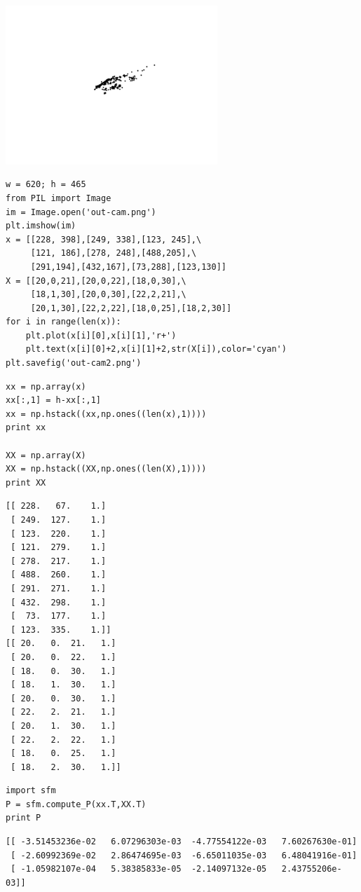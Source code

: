 \documentclass[12pt,fleqn]{article}\usepackage{../common}
\begin{document}
\includegraphics[height=6cm]{mvg_03.png}


\begin{verbatim}
w = 620; h = 465
from PIL import Image
im = Image.open('out-cam.png')
plt.imshow(im)
x = [[228, 398],[249, 338],[123, 245],\
     [121, 186],[278, 248],[488,205],\
     [291,194],[432,167],[73,288],[123,130]]
X = [[20,0,21],[20,0,22],[18,0,30],\
     [18,1,30],[20,0,30],[22,2,21],\
     [20,1,30],[22,2,22],[18,0,25],[18,2,30]]
for i in range(len(x)): 
    plt.plot(x[i][0],x[i][1],'r+')
    plt.text(x[i][0]+2,x[i][1]+2,str(X[i]),color='cyan')
plt.savefig('out-cam2.png')
\end{verbatim}


\begin{verbatim}
xx = np.array(x)
xx[:,1] = h-xx[:,1]
xx = np.hstack((xx,np.ones((len(x),1))))
print xx

XX = np.array(X)
XX = np.hstack((XX,np.ones((len(X),1))))
print XX
\end{verbatim}

\begin{verbatim}
[[ 228.   67.    1.]
 [ 249.  127.    1.]
 [ 123.  220.    1.]
 [ 121.  279.    1.]
 [ 278.  217.    1.]
 [ 488.  260.    1.]
 [ 291.  271.    1.]
 [ 432.  298.    1.]
 [  73.  177.    1.]
 [ 123.  335.    1.]]
[[ 20.   0.  21.   1.]
 [ 20.   0.  22.   1.]
 [ 18.   0.  30.   1.]
 [ 18.   1.  30.   1.]
 [ 20.   0.  30.   1.]
 [ 22.   2.  21.   1.]
 [ 20.   1.  30.   1.]
 [ 22.   2.  22.   1.]
 [ 18.   0.  25.   1.]
 [ 18.   2.  30.   1.]]
\end{verbatim}


\begin{verbatim}
import sfm
P = sfm.compute_P(xx.T,XX.T)
print P
\end{verbatim}

\begin{verbatim}
[[ -3.51453236e-02   6.07296303e-03  -4.77554122e-03   7.60267630e-01]
 [ -2.60992369e-02   2.86474695e-03  -6.65011035e-03   6.48041916e-01]
 [ -1.05982107e-04   5.38385833e-05  -2.14097132e-05   2.43755206e-03]]
\end{verbatim}
\end{document}
